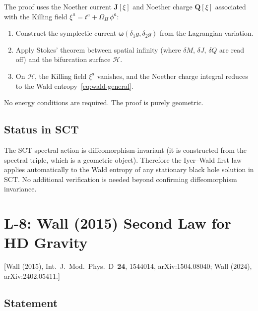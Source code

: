 \documentclass[12pt,a4paper]{article}
\theoremstyle{definition}
\theoremstyle{remark}
\newcommand{\fromlit}[1]{\textcolor{blue!70!black}{\textsf{[#1]}}}
\begin{document}
The proof uses the Noether current $\mathbf{J}[\xi]$ and Noether
charge $\mathbf{Q}[\xi]$ associated with the Killing field
$\xi^a = t^a + \Omega_H\,\phi^a$:
\begin{enumerate}[nosep]
\item Construct the symplectic current
  $\boldsymbol{\omega}(\delta_1 g, \delta_2 g)$ from the
  Lagrangian variation.
\item Apply Stokes' theorem between spatial infinity (where
  $\delta M$, $\delta J$, $\delta Q$ are read off) and the
  bifurcation surface $\mathcal{H}$.
\item On $\mathcal{H}$, the Killing field $\xi^a$ vanishes, and
  the Noether charge integral reduces to the Wald
  entropy~\eqref{eq:wald-general}.
\end{enumerate}
No energy conditions are required.  The proof is purely geometric.

\subsection{Status in SCT}

The SCT spectral action is diffeomorphism-invariant (it is
constructed from the spectral triple, which is a geometric object).
Therefore the Iyer--Wald first law applies automatically to the
Wald entropy of any stationary black hole solution in SCT.
No additional verification is needed beyond confirming
diffeomorphism invariance.


\section{L-8: Wall (2015) Second Law for HD Gravity}
\label{sec:L8}

\fromlit{Wall (2015), Int.\ J.\ Mod.\ Phys.\ D~\textbf{24}, 1544014,
arXiv:1504.08040;
Wall (2024), arXiv:2402.05411.}

\subsection{Statement}
\end{document}

